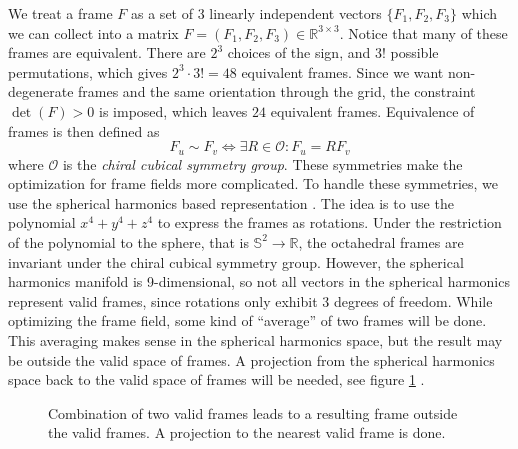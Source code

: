 \documentclass[../thesis.tex]{subfiles}
\begin{document}
We treat a frame $F$ as a set of 3 linearly independent vectors $\{F_1,F_2,F_3 \}$ which we can
collect into a matrix $F=(F_1,F_2,F_3) \in \mathbb{R}^{3\times 3}$.
Notice that many of these frames are equivalent.
There are $2^3$ choices of the sign, and $3!$ possible permutations, which
gives $2^3\cdot 3! = 48$ equivalent frames.
Since we want non-degenerate frames and the same orientation through the grid, the constraint $\det(F)>0$ is imposed,
which leaves $24$ equivalent frames.
Equivalence of frames is then defined as
$$F_u \sim F_v \iff \exists R \in \mathcal{O} : F_u=RF_v$$
where $\mathcal{O}$ is the \emph{chiral cubical symmetry group}\cite{Nieser}.
These symmetries make the optimization for frame fields more complicated.
To handle these symmetries, we use the spherical harmonics based representation \cite{Huang}.
The idea is to use the polynomial $x^4+y^4+z^4$ to express the frames as rotations.
Under the restriction of the polynomial to the sphere, that is $\mathbb{S}^2\to \mathbb{R}$, the octahedral frames
are invariant under the chiral cubical symmetry group. However, the spherical harmonics
manifold is 9-dimensional, so not all vectors in the spherical harmonics represent valid frames,
since rotations only exhibit 3 degrees of freedom.
While optimizing the frame field, some kind of ``average'' of two frames will be done.
This averaging makes sense in the spherical harmonics space, but the result may be outside the valid
space of frames. A projection from the spherical
harmonics space back to the valid space of frames will be needed, see figure \ref{fig:projection} \cite{Ray}.
\begin{figure}[htb]
  \centering
  \def\svgwidth{30em}
  
  \caption{Combination of two valid frames leads to a resulting frame outside the valid frames. A projection to the nearest valid frame is done.}
  \label{fig:projection}
\end{figure}
\end{document}
